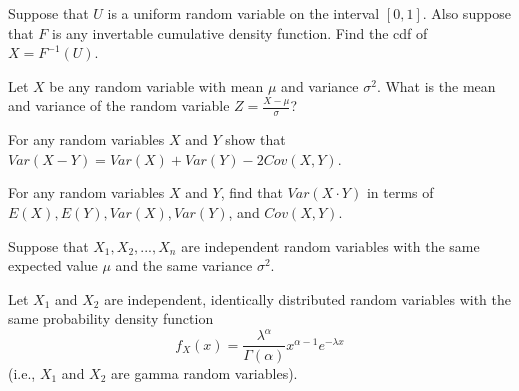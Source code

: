\documentclass[addpoints]{examsetup}\usepackage[]{graphicx}\usepackage[]{color}
\begin{document}



\examCoverPage

\begin{questions}

\question[5] 
Suppose that $U$ is a uniform random variable on the interval $[0,1]$. Also suppose that $F$ is any invertable cumulative density function. Find the cdf of $X = F^{-1}(U)$.

\question[5] 
Let $X$ be any random variable with mean $\mu$ and variance $\sigma^2$. What is the mean and variance of the random variable $Z = \frac{X - \mu}{\sigma}$?

\question[5] 
For any random variables $X$ and $Y$ show that $Var(X - Y) = Var(X) + Var(Y) - 2 Cov(X, Y)$.

\question[5] 
For any random variables $X$ and $Y$, find that $Var(X \cdot Y)$ in terms of $E(X), E(Y), Var(X), Var(Y)$, and $Cov(X,Y)$.

\question
Suppose that $X_1, X_2, ..., X_n$ are independent random variables with the same expected value $\mu$ and the same variance $\sigma^2$.

\question
Let $X_1$ and $X_2$ are independent, identically distributed random variables with the same probability density function
\[
   f_{X}(x) = \dfrac{\lambda^{\alpha}}{\Gamma(\alpha)} x^{\alpha - 1} e^{-\lambda x}
\]
(i.e., $X_1$ and $X_2$ are gamma random variables).
\end{questions}
\end{document}
